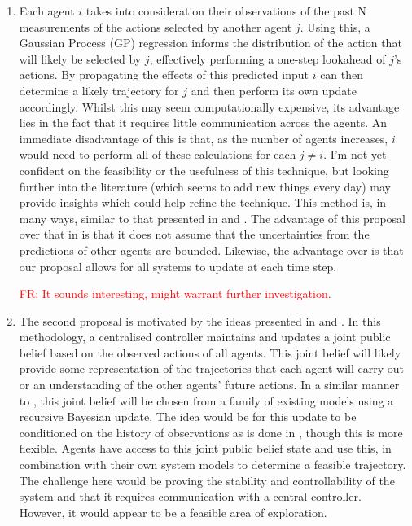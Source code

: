 \documentclass[preprint,11pt]{report}
\newcommand\fr[1]{\textcolor{red}{FR: #1}}
\begin{document}
\begin{enumerate}
	\item Each agent $i$ takes into consideration their
          observations of the past N measurements of the actions
          selected by another agent $j$. Using this, a Gaussian
          Process (GP) regression informs the distribution of the
          action that will likely be selected by $j$, effectively
          performing a one-step lookahead of $j$'s actions. By
          propagating the effects of this predicted input $i$ can then
          determine a likely trajectory for $j$ and then perform its
          own update accordingly. Whilst this may seem computationally
          expensive, its advantage lies in the fact that it requires
          little communication across the agents. An immediate
          disadvantage of this is that, as the number of agents
          increases, $i$ would need to perform all of these
          calculations for each $j \neq i$. I'm not yet confident on
          the feasibility or the usefulness of this technique, but
          looking further into the literature (which seems to add new
          things every day) may provide insights which could help
          refine the technique. This method is, in many ways, similar
          to that presented in \cite{Conte2014} and
          \cite{Dai2017}. The advantage of this proposal over that in
          \cite{Conte2014} is that it does not assume that the
          uncertainties from the predictions of other agents are
          bounded. Likewise, the advantage over \cite{Dai2017} is that
          our proposal allows for all systems to update at each time
          step.

          \fr{It sounds interesting, might warrant further
            investigation.}

	\item The second proposal is motivated by the ideas presented in \cite{Foerster} and 
	\cite{Heirung2019}. In this methodology, a centralised controller maintains and updates a joint
	public belief based on the observed actions of all agents. This joint belief will likely provide
	some representation of the trajectories that each agent will carry out or an understanding of
	the other agents' future actions. In a similar manner to \cite{Heirung2019}, this joint belief
	will be chosen from a family of existing models using a recursive Bayesian update. The idea
	would be for this update to be conditioned on the history of observations as is done in 
	\cite{Wingate2012}, though this is more flexible. Agents have access to this joint public belief
	state and use this, in combination with their own system models to determine a feasible
	trajectory. The challenge here would be proving the stability and controllability of the system
	and that it requires communication with a central controller. However, it would appear to be a
	feasible area of exploration.
\end{enumerate}
\end{document}
